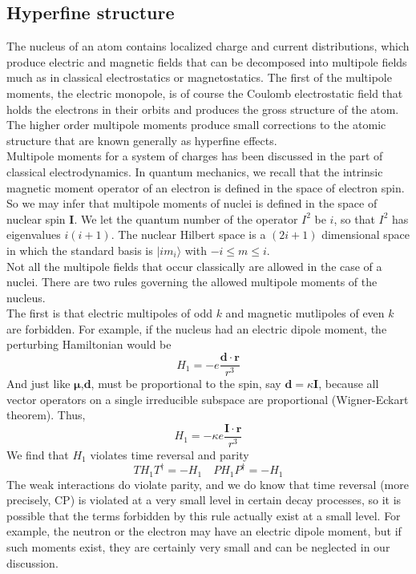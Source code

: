 \documentclass[cyan]{elegantnote}
\begin{document}
\subsection{Hyperfine structure}
The nucleus of an atom contains localized charge and current distributions, which produce electric and magnetic fields that can be decomposed into multipole fields much as in classical electrostatics or magnetostatics.
The first of the multipole moments, the electric monopole, is of course the Coulomb electrostatic field that holds the electrons in their orbits and produces the gross structure of the atom.
The higher order multipole moments produce small corrections to the atomic structure that are known generally as hyperfine effects.\\
Multipole moments for a system of charges has been discussed in the part of classical electrodynamics. In quantum mechanics, we recall that the intrinsic magnetic moment operator of an electron is defined in the space of electron spin. So we may infer that multipole moments of nuclei is defined in the space of nuclear spin $\bm{I}$. 
We let the quantum number of the operator $I^2$ be $i$, so that $I^2$ has eigenvalues $i(i+1)$. The nuclear Hilbert space is a  $(2i+1)$ dimensional space in which the standard basis is $|im_i\rangle$ with $-i \leq m \leq i$.\\
Not all the multipole fields that occur classically are allowed in the case of a nuclei. There are two rules governing the allowed multipole moments of the nucleus.\\ 
The first is that electric multipoles of odd $k$ and magnetic mutlipoles of even $k$ are forbidden. For example, if the nucleus had an electric dipole moment, the perturbing Hamiltonian would be
\[H_1 = -e \frac{\bm{d}\cdot\bm{r}}{r^3}\]
And just like $\bm{\mu}$,$\bm{d}$, must be proportional to the spin, say $\bm{d} = \kappa\bm{I}$, because all vector operators on a single irreducible subspace are proportional (Wigner-Eckart theorem). Thus,
\[H_1 = -\kappa e \frac{\bm{I}\cdot\bm{r}}{r^3}\]
We find that $H_1$ violates time reversal and parity
\[T H_1 T^{\dagger} = -H_1 \quad P H_1 P^{\dagger} = -H_1\]
The weak interactions do violate parity, and we do know that time reversal (more precisely, CP) is violated at a very small  level in certain decay processes, so it is possible that the terms forbidden by this rule actually exist at a small level. For example, the neutron or the electron may have an electric dipole moment, but if such moments exist, they are certainly very small and can be neglected in our discussion.\\
\end{document}
